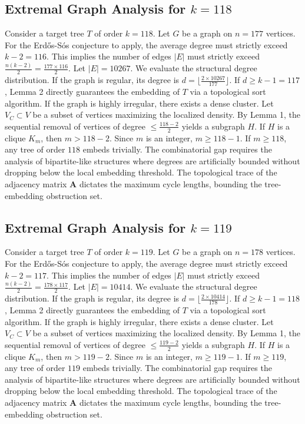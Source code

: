 \documentclass[11pt,a4paper]{article}
\begin{document}
\subsection{Extremal Graph Analysis for $k=118$}
Consider a target tree $T$ of order $k=118$.
Let $G$ be a graph on $n=177$ vertices.
For the Erd\H{o}s-S\'os conjecture to apply, the average degree must strictly exceed $k-2 = 116$.
This implies the number of edges $|E|$ must strictly exceed $\frac{n(k-2)}{2} = \frac{177 \times 116}{2}$.
Let $|E| = 10267$.
We evaluate the structural degree distribution. If the graph is regular, its degree is $d = \lfloor \frac{2 \times 10267}{177} \rfloor$.
If $d \geq k-1 = 117$, Lemma 2 directly guarantees the embedding of $T$ via a topological sort algorithm.
If the graph is highly irregular, there exists a dense cluster. Let $V_C \subset V$ be a subset of vertices maximizing the localized density.
By Lemma 1, the sequential removal of vertices of degree $\leq \frac{118-2}{2}$ yields a subgraph $H$.
If $H$ is a clique $K_{m}$, then $m > 118-2$. Since $m$ is an integer, $m \geq 118-1$. If $m \geq 118$, any tree of order $118$ embeds trivially.
The combinatorial gap requires the analysis of bipartite-like structures where degrees are artificially bounded without dropping below the local embedding threshold. The topological trace of the adjacency matrix $\mathbf{A}$ dictates the maximum cycle lengths, bounding the tree-embedding obstruction set.


\subsection{Extremal Graph Analysis for $k=119$}
Consider a target tree $T$ of order $k=119$.
Let $G$ be a graph on $n=178$ vertices.
For the Erd\H{o}s-S\'os conjecture to apply, the average degree must strictly exceed $k-2 = 117$.
This implies the number of edges $|E|$ must strictly exceed $\frac{n(k-2)}{2} = \frac{178 \times 117}{2}$.
Let $|E| = 10414$.
We evaluate the structural degree distribution. If the graph is regular, its degree is $d = \lfloor \frac{2 \times 10414}{178} \rfloor$.
If $d \geq k-1 = 118$, Lemma 2 directly guarantees the embedding of $T$ via a topological sort algorithm.
If the graph is highly irregular, there exists a dense cluster. Let $V_C \subset V$ be a subset of vertices maximizing the localized density.
By Lemma 1, the sequential removal of vertices of degree $\leq \frac{119-2}{2}$ yields a subgraph $H$.
If $H$ is a clique $K_{m}$, then $m > 119-2$. Since $m$ is an integer, $m \geq 119-1$. If $m \geq 119$, any tree of order $119$ embeds trivially.
The combinatorial gap requires the analysis of bipartite-like structures where degrees are artificially bounded without dropping below the local embedding threshold. The topological trace of the adjacency matrix $\mathbf{A}$ dictates the maximum cycle lengths, bounding the tree-embedding obstruction set.
\end{document}
